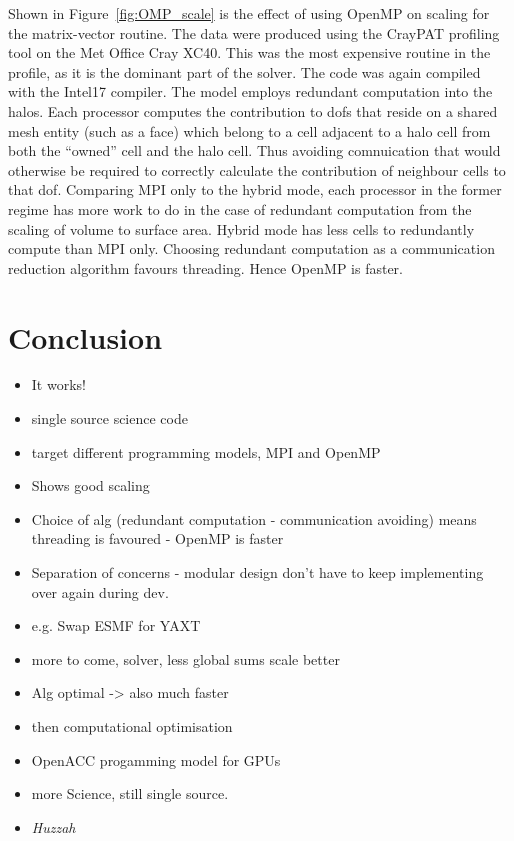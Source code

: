 \documentclass[review,times]{elsarticle}
\begin{document}
Shown in Figure~\ref{fig:OMP_scale} is the effect of using OpenMP on 
scaling for the matrix-vector routine. The data were produced using
the CrayPAT profiling tool on the Met Office Cray XC40. This was the
most expensive routine in the profile, as it is the dominant part of
the solver. The code was
again compiled with the Intel17 compiler. The model employs redundant
computation into the halos. Each processor computes the contribution
to dofs that reside on a shared mesh
entity (such as a face) which belong to a cell adjacent to a halo cell
from both the ``owned'' cell and the halo cell. Thus avoiding
comnuication that would otherwise be required to correctly calculate
the contribution of neighbour cells to that dof. Comparing MPI only to
the hybrid mode, each processor in the former regime has more work to
do in the case of redundant computation from the scaling of volume to
surface area. Hybrid mode has less cells to redundantly compute than
MPI only. Choosing redundant computation as a communication reduction
algorithm favours threading. Hence OpenMP is faster.
 

\section{Conclusion}
\label{sec:con}
\begin{itemize}
   \item It works! 
   \item single source science code
   \item target different programming models, MPI and OpenMP
   \item Shows good scaling
   \item Choice of alg (redundant computation - communication
     avoiding) means threading is favoured - OpenMP is faster
   \item Separation of concerns - modular design don't have to keep
     implementing over again during dev.
   \item e.g. Swap ESMF for YAXT
   \item more to come, solver, less global sums scale better
   \item Alg optimal -> also much faster
   \item then computational optimisation
   \item OpenACC progamming model for GPUs
   \item more Science, still single source.
   \item {\em Huzzah}
\end{itemize}
\newpage


\end{document}
